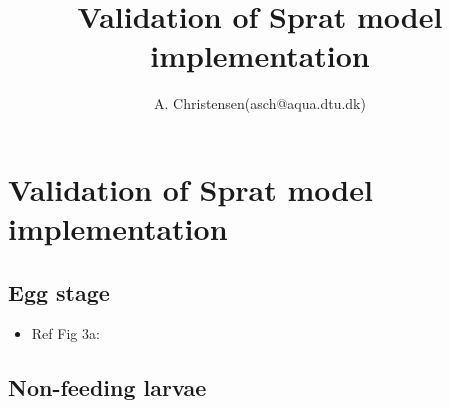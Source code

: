 \documentclass[dvips,a4,graphicx]{article}          %
\title{Validation of Sprat model implementation}    %
\author{A. Christensen(asch@aqua.dtu.dk)}           %
\begin{document}
\maketitle                                          %
\section{Validation of Sprat model implementation}   
\subsection{Egg stage}   
\begin{itemize}
  \item Ref \cite{Daewel2011} Fig 3a:
\end{itemize}
\subsection{Non-feeding larvae}      
\end{document}
